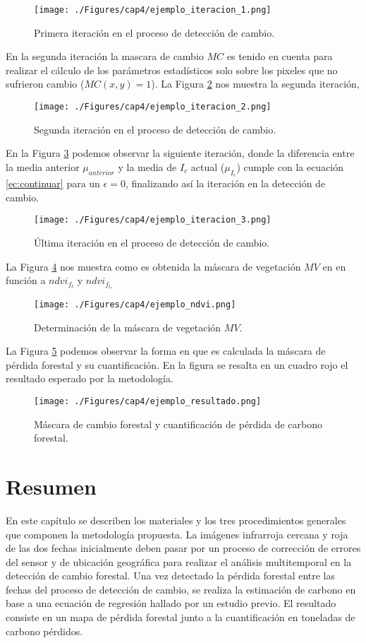 \begin{figure}[H]
	\centering
	\texttt{[image: ./Figures/cap4/ejemplo\_iteracion\_1.png]}
	\caption{Primera iteraci\'on en el proceso de detecci\'on de cambio.}
	\label{fig:ejemplo_2}
\end{figure}
En la segunda iteraci\'on la mascara de cambio $ MC $ es tenido en cuenta para realizar el c\'alculo de los par\'ametros estad\'isticos solo sobre los pixeles que no sufrieron cambio ($ MC(x,y)=1 $). La Figura \ref{fig:ejemplo_3} nos muestra la segunda iteraci\'on, 
\begin{figure}[H]
	\centering
	\texttt{[image: ./Figures/cap4/ejemplo\_iteracion\_2.png]}
	\caption{Segunda iteraci\'on en el proceso de detecci\'on de cambio.}
	\label{fig:ejemplo_3}
\end{figure}
En la Figura \ref{fig:ejemplo_4} podemos observar la siguiente iteraci\'on, donde la diferencia entre la media anterior $ \mu_{anterior} $ y la media de $ I_{c} $ actual ($ \mu_{I_{c}} $) cumple con la ecuaci\'on \ref{ec:continuar} para un $\epsilon=0 $, finalizando as\'i la iteraci\'on en la detecci\'on de cambio.
\begin{figure}[H]
	\centering
	\texttt{[image: ./Figures/cap4/ejemplo\_iteracion\_3.png]}
	\caption{\'Ultima iteraci\'on en el proceso de detecci\'on de cambio.}
	\label{fig:ejemplo_4}
\end{figure}
La Figura \ref{fig:ejemplo_5} nos muestra como es obtenida la m\'ascara de vegetaci\'on $ MV $ en en funci\'on a $ ndvi_{f_{t}} $ y $ ndvi_{f_{t_{*}}} $
\begin{figure}[H]
	\centering
	\texttt{[image: ./Figures/cap4/ejemplo\_ndvi.png]}
	\caption{Determinaci\'on de la m\'ascara de vegetaci\'on $ MV $.}
	\label{fig:ejemplo_5}
\end{figure}
La Figura \ref{fig:ejemplo_6} podemos observar la forma en que es calculada la m\'ascara de p\'erdida forestal y su cuantificaci\'on. En la figura se resalta en un cuadro rojo el resultado esperado por la metodolog\'ia. 
\begin{figure}[H]
	\centering
	\texttt{[image: ./Figures/cap4/ejemplo\_resultado.png]}
	\caption{M\'ascara de cambio forestal y cuantificaci\'on de p\'erdida de carbono forestal.}
	\label{fig:ejemplo_6}
\end{figure}
\section{Resumen}
En este cap\'itulo se describen los materiales y los tres procedimientos generales que componen la metodolog\'ia propuesta. La im\'agenes infrarroja cercana y roja de las dos fechas inicialmente deben pasar por un proceso de correcci\'on de errores del sensor y de ubicaci\'on geogr\'afica para realizar el an\'alisis multitemporal en la detecci\'on de cambio forestal. Una vez detectado la p\'erdida forestal entre las fechas del proceso de detecci\'on de cambio, se realiza la estimaci\'on de carbono en base a una ecuaci\'on de regresi\'on hallado por un estudio previo. El resultado consiste en un mapa de p\'erdida forestal junto a la cuantificaci\'on en toneladas de carbono p\'erdidos.